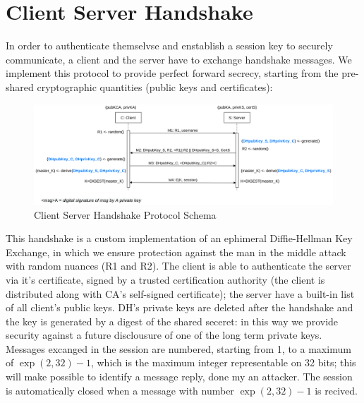 \documentclass[11pt]{report}
\begin{document}
\section{Client Server Handshake}
In order to authenticate themselvse and enstablish a session key to securely communicate, a client
and the server have to exchange handshake messages. We implement this protocol to provide perfect 
forward secrecy, starting from the pre-shared cryptographic quantities (public keys and certificates):
\begin{figure}[H]
	\centering
	\includegraphics[scale=0.19]{img/AuthClientServer.png}
	\caption{Client Server Handshake Protocol Schema}
	\label {img: AuthClientServer}
\end{figure}
This handshake is a custom implementation of an ephimeral Diffie-Hellman Key Exchange, in which we ensure
protection against the man in the middle attack with random nuances (R1 and R2). The client is able to 
authenticate the server via it's certificate, signed by a trusted certification authority (the client
is distributed along with CA's self-signed certificate); the server have a built-in list of all client's
public keys. DH's private keys are deleted after the handshake and the key is generated by a digest of the 
shared seceret: in this way we provide security against a future disclousure of one of the long term private keys.
Messages excanged in the session are numbered, starting from 1, to a maximum of $\exp(2,32)-1$, which is the
maximum integer representable on 32 bits; this will make possible to identify a message reply, done
my an attacker. The session is automatically closed when a message with number $\exp(2,32)-1$ is recived.
\newpage
\end{document}
